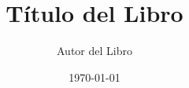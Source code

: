 \documentclass[12pt,oneside]{book}
\begin{document}
\frontmatter
\title{Título del Libro}
\author{Autor del Libro}
\date{\today}
\maketitle

\mainmatter


\end{document}
